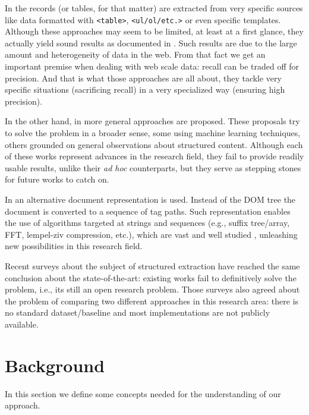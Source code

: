 \documentclass{vldb}
\begin{document}
In \cite{webtables2008, listExtract2009, tablesMS2012, tegra2015, topklists2013}
the records (or tables, for that matter) are extracted from very specific
sources like data formatted with \texttt{<table>}, \texttt{<ul/ol/etc.>} or even
specific templates. Although these approaches may seem to be limited, at least
at a first glance, they actually yield sound results as documented in
\cite{relationalWeb2008, probase, probase2012, acsdb}. Such results are due to
the large amount and heterogeneity of data in the web. From that fact we get an
important premise when dealing with web scale data: recall can be traded off for
precision. And that is what those approaches are all about, they tackle very
specific situations (sacrificing recall) in a very specialized way (ensuring
high precision).

In the other hand, in \cite{RRunner01, exalg2003, vips03, viper05, MDR03,
depta05, NET05, TPC09, vide10, gstm2010, fivatech2010, cvts2012, SuffixTree12,
clustVX2014, datapath2015, autorm2015} more general approaches are proposed.
These proposals try to solve the problem in a broader sense, some using machine
learning techniques, others grounded on general observations about structured
content. Although each of these works represent advances in the research field,
they fail to provide readily usable results, unlike their \textit{ad hoc}
counterparts, but they serve as stepping stones for future works to catch on.

In \cite{TPC09, SuffixTree12, TPS2013} an alternative document representation is
used. Instead of the DOM tree the document is converted to a sequence of tag
paths. Such representation enables the use of algorithms targeted at strings and
sequences (e.g., suffix tree/array\cite{ukkonen1995, manber1993suffix},
FFT\cite{fft1965}, lempel-ziv compression\cite{ziv1977universal}, etc.), which
are vast and well studied \cite{gusfield1997algorithms}, unleashing new
possibilities in this research field.

Recent surveys\cite{survey2013, survey2014} about the subject of structured
extraction have reached the same conclusion about the state-of-the-art: existing
works fail to definitively solve the problem, i.e., its still an open research
problem. Those surveys also agreed about the problem of comparing two different
approaches in this research area: there is no standard dataset/baseline and most
implementations are not publicly available.

\section{Background}\label{sec:defs}
In this section we define some concepts needed for the understanding of our approach.
\end{document}

